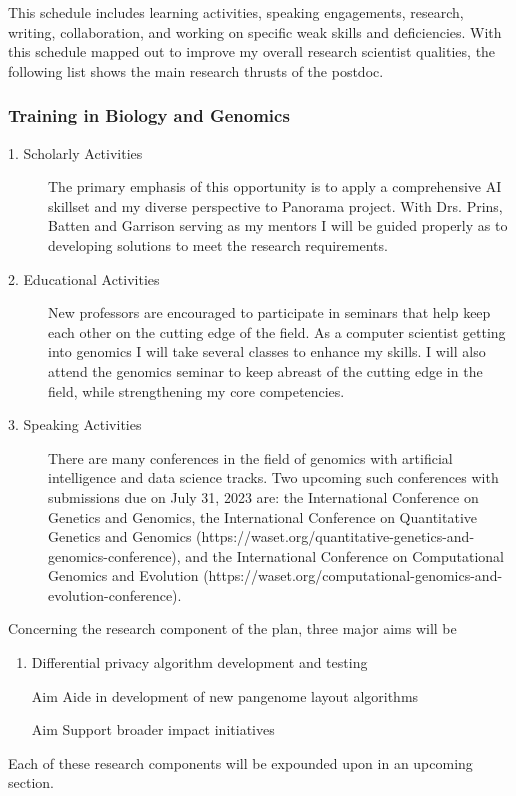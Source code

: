 This schedule includes learning activities, speaking engagements, research, writing, collaboration, and working on specific weak skills and deficiencies.
With this schedule mapped out to improve my overall research scientist qualities, the following list shows the main research thrusts of the postdoc.

\subsubsection{Training in Biology and Genomics}
\begin{description}
    \item[1. Scholarly Activities] The primary emphasis of this opportunity is to apply a comprehensive AI skillset and my diverse perspective to Panorama project. With Drs. Prins, Batten and Garrison serving as my mentors I will be guided properly as to developing solutions to meet the research requirements.
    \item[2. Educational Activities] New professors are encouraged to participate in seminars that help keep each other on the cutting edge of the field. As a computer scientist getting into genomics I will take several classes to enhance my skills. I will also attend the genomics seminar to keep abreast of the cutting edge in the field, while strengthening my core competencies.
    \item[3. Speaking Activities] There are many conferences in the field of genomics with artificial intelligence and data science tracks. Two upcoming such conferences with submissions due on July 31, 2023 are: the International Conference on Genetics and Genomics, the International Conference on Quantitative Genetics and Genomics (https://waset.org/quantitative-genetics-and-genomics-conference), and the International Conference on Computational Genomics and Evolution (https://waset.org/computational-genomics-and-evolution-conference). 
  \end{description}

Concerning the research component of the plan, three major aims will be 
\begin{enumerate}[noitemsep]
    \item Differential privacy algorithm development and testing
	\item[Aim] Aide in development of new pangenome layout algorithms
	\item[Aim] Support broader impact initiatives 
\end{enumerate} 

Each of these research components will be expounded upon in an upcoming section.